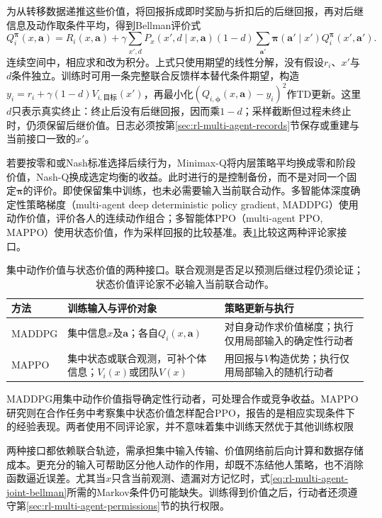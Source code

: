 为从转移数据递推这些价值，将回报拆成即时奖励与折扣后的后继回报，再对后继信息及动作取条件平均，得到Bellman评价式
\begin{equation}
 Q_i^{\bm\pi}(x,\bm a)=R_i(x,\bm a)+
 \gamma\sum_{x',d}P_x(x',d\mid x,\bm a)(1-d)
       \sum_{\bm a'}\bm\pi(\bm a'\mid x')Q_i^{\bm\pi}(x',\bm a').
 \label{eq:rl-multi-agent-joint-bellman}
\end{equation}
连续空间中，相应求和改为积分。上式只使用期望的线性分解，没有假设$r_i$、$x'$与$d$条件独立。训练时可用一条完整联合反馈样本替代条件期望，构造
$y_i=r_i+\gamma(1-d)V_{i,\text{目标}}(x')$，再最小化$(Q_{i,\bm\phi}(x,\bm a)-y_i)^2$作TD更新。这里$d$只表示真实终止：终止后没有后继回报，因而乘$1-d$；采样截断但过程未终止时，仍须保留后继价值。日志必须按第\ref{sec:rl-multi-agent-records}节保存或重建与当前接口一致的$x'$。

若要按零和或Nash标准选择后续行为，Minimax-Q将内层策略平均换成零和阶段价值，Nash-Q换成选定均衡的收益。此时进行的是控制备份，而不是对同一个固定$\bm\pi$的评价。即使保留集中训练，也未必需要输入当前联合动作。多智能体深度确定性策略梯度（multi-agent deep deterministic policy gradient, MADDPG）使用动作价值，评价各人的连续动作组合；多智能体PPO（multi-agent PPO, MAPPO）使用状态价值，作为采样回报的比较基准。表\ref{tab:rl-multi-agent-critics}比较这两种评论家接口。

\begin{table}[htbp]
 \centering
 \begin{tabularx}{\linewidth}{@{}l >{\raggedright\arraybackslash}X >{\raggedright\arraybackslash}X@{}}
 \toprule
 方法 & 训练输入与评价对象 & 策略更新与执行\\
 \midrule
 MADDPG & 集中信息$x$及$\bm a$；各自$Q_i(x,\bm a)$ & 对自身动作求价值梯度；执行仅用局部输入的确定性行动者\\
 MAPPO & 集中状态或联合观测，可补个体信息；$V_i(x)$或团队$V(x)$ & 用回报与$V$构造优势；执行仅用局部输入的随机行动者\\
 \bottomrule
 \end{tabularx}
 \caption{集中动作价值与状态价值的两种接口。联合观测是否足以预测后继过程仍须论证；状态价值评论家不必输入当前联合动作。}
 \label{tab:rl-multi-agent-critics}
\end{table}

MADDPG用集中动作价值指导确定性行动者，可处理合作或竞争收益。MAPPO研究则在合作任务中考察集中状态价值怎样配合PPO，报告的是相应实现条件下的经验表现。两者使用不同评论家，并不意味着集中训练天然优于其他训练权限

两种接口都依赖联合轨迹，需承担集中输入传输、价值网络前后向计算和数据存储成本。更充分的输入可帮助区分他人动作的作用，却既不冻结他人策略，也不消除函数逼近误差。尤其当$x$只含当前观测、遗漏对方记忆时，式\eqref{eq:rl-multi-agent-joint-bellman}所需的Markov条件仍可能缺失。训练得到价值之后，行动者还须遵守第\ref{sec:rl-multi-agent-permissions}节的执行权限。

